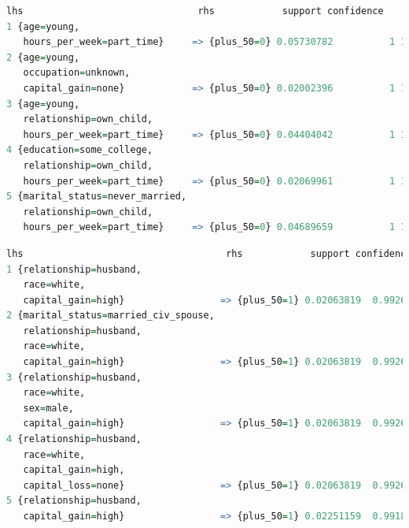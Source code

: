 \documentclass[a4paper]{llncs}
\begin{document}
\begin{lstlisting}[language=r,frame=single,breaklines=true,basicstyle=\footnotesize\ttfamily,caption={Association rules for small income.},label=arules_small_income]
  lhs                               rhs            support confidence     lift
1 {age=young,                                                                 
   hours_per_week=part_time}     => {plus_50=0} 0.05730782          1 1.317193
2 {age=young,                                                                 
   occupation=unknown,                                                        
   capital_gain=none}            => {plus_50=0} 0.02002396          1 1.317193
3 {age=young,                                                                 
   relationship=own_child,                                                    
   hours_per_week=part_time}     => {plus_50=0} 0.04404042          1 1.317193
4 {education=some_college,                                                    
   relationship=own_child,                                                    
   hours_per_week=part_time}     => {plus_50=0} 0.02069961          1 1.317193
5 {marital_status=never_married,                                              
   relationship=own_child,                                                    
   hours_per_week=part_time}     => {plus_50=0} 0.04689659          1 1.317193
\end{lstlisting}

\begin{lstlisting}[language=r,frame=single,breaklines=true,basicstyle=\footnotesize\ttfamily,caption={Association rules for large income.},label=arules_large_income]
  lhs                                    rhs            support confidence     lift
1 {relationship=husband,                                                           
   race=white,                                                                     
   capital_gain=high}                 => {plus_50=1} 0.02063819  0.9926145 4.121990
2 {marital_status=married_civ_spouse,                                              
   relationship=husband,                                                           
   race=white,                                                                     
   capital_gain=high}                 => {plus_50=1} 0.02063819  0.9926145 4.121990
3 {relationship=husband,                                                           
   race=white,                                                                     
   sex=male,                                                                       
   capital_gain=high}                 => {plus_50=1} 0.02063819  0.9926145 4.121990
4 {relationship=husband,                                                           
   race=white,                                                                     
   capital_gain=high,                                                              
   capital_loss=none}                 => {plus_50=1} 0.02063819  0.9926145 4.121990
5 {relationship=husband,                                                           
   capital_gain=high}                 => {plus_50=1} 0.02251159  0.9918809 4.118943
\end{lstlisting}
\end{document}
